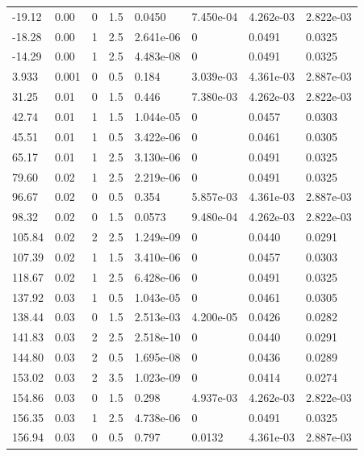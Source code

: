 \documentclass[preview]{standalone}
\begin{document}
{{\begin{tabular}{L{1.2cm}C{1.2cm} C{0.3cm}C{0.5cm} C{1.4cm}C{1.4cm} C{1.4cm}C{1.4cm}}
  -19.12  &  0.00  & 0     & 1.5 &  0.0450  & 7.450e-04  & 4.262e-03 &  2.822e-03   \\ 
  -18.28  &  0.00  & 1     & 2.5 &  2.641e-06  & 0  & 0.0491 &  0.0325   \\ 
  -14.29  &  0.00  & 1     & 2.5 &  4.483e-08  & 0  & 0.0491 &  0.0325   \\ 
  3.933  &  0.001  & 0     & 0.5 &  0.184  & 3.039e-03  & 4.361e-03 &  2.887e-03   \\ 
  31.25  &  0.01  & 0     & 1.5 &  0.446  & 7.380e-03  & 4.262e-03 &  2.822e-03   \\ 
  42.74  &  0.01  & 1     & 1.5 &  1.044e-05  & 0  & 0.0457 &  0.0303   \\ 
  45.51  &  0.01  & 1     & 0.5 &  3.422e-06  & 0  & 0.0461 &  0.0305   \\ 
  65.17  &  0.01  & 1     & 2.5 &  3.130e-06  & 0  & 0.0491 &  0.0325   \\ 
  79.60  &  0.02  & 1     & 2.5 &  2.219e-06  & 0  & 0.0491 &  0.0325   \\ 
  96.67  &  0.02  & 0     & 0.5 &  0.354  & 5.857e-03  & 4.361e-03 &  2.887e-03   \\ 
  98.32  &  0.02  & 0     & 1.5 &  0.0573  & 9.480e-04  & 4.262e-03 &  2.822e-03   \\ 
  105.84  &  0.02  & 2     & 2.5 &  1.249e-09  & 0  & 0.0440 &  0.0291   \\ 
  107.39  &  0.02  & 1     & 1.5 &  3.410e-06  & 0  & 0.0457 &  0.0303   \\ 
  118.67  &  0.02  & 1     & 2.5 &  6.428e-06  & 0  & 0.0491 &  0.0325   \\ 
  137.92  &  0.03  & 1     & 0.5 &  1.043e-05  & 0  & 0.0461 &  0.0305   \\ 
  138.44  &  0.03  & 0     & 1.5 &  2.513e-03  & 4.200e-05  & 0.0426 &  0.0282   \\ 
  141.83  &  0.03  & 2     & 2.5 &  2.518e-10  & 0  & 0.0440 &  0.0291   \\ 
  144.80  &  0.03  & 2     & 0.5 &  1.695e-08  & 0  & 0.0436 &  0.0289   \\ 
  153.02  &  0.03  & 2     & 3.5 &  1.023e-09  & 0  & 0.0414 &  0.0274   \\ 
  154.86  &  0.03  & 0     & 1.5 &  0.298  & 4.937e-03  & 4.262e-03 &  2.822e-03   \\ 
  156.35  &  0.03  & 1     & 2.5 &  4.738e-06  & 0  & 0.0491 &  0.0325   \\ 
  156.94  &  0.03  & 0     & 0.5 &  0.797  & 0.0132  & 4.361e-03 &  2.887e-03   \\ 

\end{tabular}}}
\end{document}
